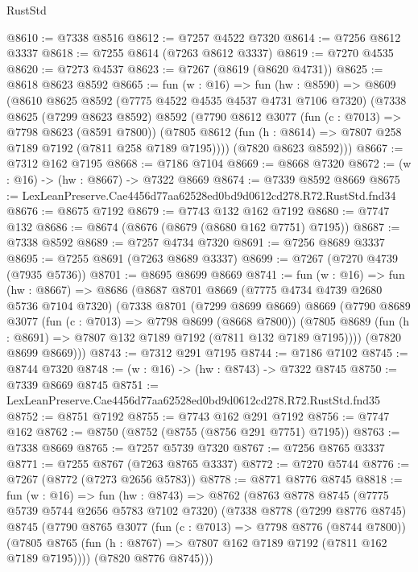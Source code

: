 \begin{lexlean}{RustStd}
\begin{coremodule}
@8610 := @7338 @8516
@8612 := @7257 @4522 @7320
@8614 := @7256 @8612 @3337
@8618 := @7255 @8614 (@7263 @8612 @3337)
@8619 := @7270 @4535
@8620 := @7273 @4537
@8623 := @7267 (@8619 (@8620 @4731))
@8625 := @8618 @8623 @8592
@8665 := fun (w : @16) =>
  fun (hw : @8590) =>
  @8609
    (@8610
      @8625
      @8592
      (@7775 @4522 @4535 @4537 @4731 @7106 @7320)
      (@7338
        @8625
        (@7299 @8623 @8592)
        @8592
        (@7790
          @8612
          @3077
          (fun (c : @7013) => @7798 @8623 (@8591 @7800))
          (@7805 @8612 (fun (h : @8614) => @7807 @258 @7189 @7192 (@7811 @258 @7189 @7195))))
        (@7820 @8623 @8592)))
@8667 := @7312 @162 @7195
@8668 := @7186 @7104
@8669 := @8668 @7320
@8672 := (w : @16) -> (hw : @8667) -> @7322 @8669
@8674 := @7339 @8592 @8669
@8675 := LexLeanPreserve.Cae4456d77aa62528ed0bd9d0612cd278.R72.RustStd.fnd34
@8676 := @8675 @7192
@8679 := @7743 @132 @162 @7192
@8680 := @7747 @132
@8686 := @8674 (@8676 (@8679 (@8680 @162 @7751) @7195))
@8687 := @7338 @8592
@8689 := @7257 @4734 @7320
@8691 := @7256 @8689 @3337
@8695 := @7255 @8691 (@7263 @8689 @3337)
@8699 := @7267 (@7270 @4739 (@7935 @5736))
@8701 := @8695 @8699 @8669
@8741 := fun (w : @16) =>
  fun (hw : @8667) =>
  @8686
    (@8687
      @8701
      @8669
      (@7775 @4734 @4739 @2680 @5736 @7104 @7320)
      (@7338
        @8701
        (@7299 @8699 @8669)
        @8669
        (@7790
          @8689
          @3077
          (fun (c : @7013) => @7798 @8699 (@8668 @7800))
          (@7805 @8689 (fun (h : @8691) => @7807 @132 @7189 @7192 (@7811 @132 @7189 @7195))))
        (@7820 @8699 @8669)))
@8743 := @7312 @291 @7195
@8744 := @7186 @7102
@8745 := @8744 @7320
@8748 := (w : @16) -> (hw : @8743) -> @7322 @8745
@8750 := @7339 @8669 @8745
@8751 := LexLeanPreserve.Cae4456d77aa62528ed0bd9d0612cd278.R72.RustStd.fnd35
@8752 := @8751 @7192
@8755 := @7743 @162 @291 @7192
@8756 := @7747 @162
@8762 := @8750 (@8752 (@8755 (@8756 @291 @7751) @7195))
@8763 := @7338 @8669
@8765 := @7257 @5739 @7320
@8767 := @7256 @8765 @3337
@8771 := @7255 @8767 (@7263 @8765 @3337)
@8772 := @7270 @5744
@8776 := @7267 (@8772 (@7273 @2656 @5783))
@8778 := @8771 @8776 @8745
@8818 := fun (w : @16) =>
  fun (hw : @8743) =>
  @8762
    (@8763
      @8778
      @8745
      (@7775 @5739 @5744 @2656 @5783 @7102 @7320)
      (@7338
        @8778
        (@7299 @8776 @8745)
        @8745
        (@7790
          @8765
          @3077
          (fun (c : @7013) => @7798 @8776 (@8744 @7800))
          (@7805 @8765 (fun (h : @8767) => @7807 @162 @7189 @7192 (@7811 @162 @7189 @7195))))
        (@7820 @8776 @8745)))

\end{coremodule}
\end{lexlean}
